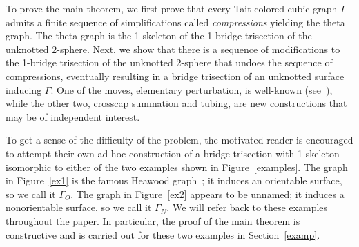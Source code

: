 \documentclass[11pt, oneside]{amsart}
\theoremstyle{theorem}
\theoremstyle{definition}
\theoremstyle{theorem}
\begin{document}
To prove the main theorem, we first prove that every Tait-colored cubic graph $\Gamma$ admits a finite sequence of simplifications called \emph{compressions} yielding the theta graph. The theta graph is the 1-skeleton of the 1-bridge trisection of the unknotted 2-sphere.  Next, we show that there is a sequence of modifications to the 1-bridge trisection of the unknotted 2-sphere that undoes the sequence of compressions, eventually resulting in a bridge trisection of an unknotted surface inducing $\Gamma$.  One of the moves, elementary perturbation, is well-known (see~\cite{MZB1}), while the other two, crosscap summation and tubing, are new constructions that may be of independent interest.

To get a sense of the difficulty of the problem, the motivated reader is encouraged to attempt their own ad hoc construction of a bridge trisection with 1-skeleton isomorphic to either of the two examples shown in Figure~\ref{examples}.  The graph in Figure~\ref{ex1} is the famous Heawood graph~\cite{heawood}; it induces an orientable surface, so we call it $\Gamma_O$.  The graph in Figure~\ref{ex2} appears to be unnamed; it induces a nonorientable surface, so we call it $\Gamma_N$.  We will refer back to these examples throughout the paper.  In particular, the proof of the main theorem is constructive and is carried out for these two examples in Section~\ref{examp}.
\end{document}
